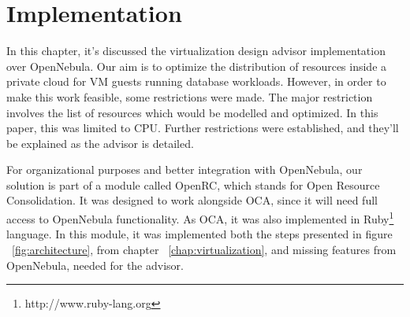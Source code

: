 \chapter{\textbf{Implementation}}

\label{chap:implementation}

In this chapter, it's discussed the virtualization design advisor implementation over OpenNebula. Our aim is to optimize the distribution of resources inside a private cloud for VM guests running database workloads. However, in order to make this work feasible, some restrictions were made. The major restriction involves the list of resources which would be modelled and optimized. In this paper, this was limited to CPU. Further restrictions were established, and they'll be explained as the advisor is detailed.

For organizational purposes and better integration with OpenNebula, our solution  is part of a module called OpenRC, which stands for Open Resource Consolidation. It was designed to work alongside OCA, since it will need full access to OpenNebula functionality. As OCA, it was also implemented in Ruby\footnote{http://www.ruby-lang.org} language. In this module, it was implemented both the steps presented in figure ~\ref{fig:architecture}, from chapter ~\ref{chap:virtualization}, and missing features from OpenNebula, needed for the advisor.

